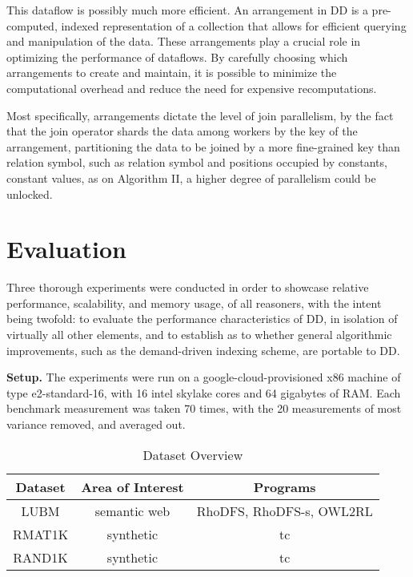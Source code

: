 \documentclass[sigconf,screen,review=false,natbib]{acmart}
\theoremstyle{definition}
\begin{document}
This dataflow is possibly much more efficient. An arrangement in DD is a pre-computed, indexed representation of a collection that allows
for efficient querying and manipulation of the data. These arrangements play a crucial role in optimizing the performance of dataflows. By carefully choosing
which arrangements to create and maintain, it is possible to minimize the computational overhead and reduce the need for expensive recomputations.

Most specifically, arrangements dictate the level of join parallelism, by the fact that the join operator shards the data among workers by the key of
the arrangement, partitioning the data to be joined by a more fine-grained key than relation symbol, such as relation symbol and positions occupied by constants,
constant values, as on Algorithm II, a higher degree of parallelism could be unlocked.
\section{Evaluation}
Three thorough experiments were conducted in order to showcase relative performance, scalability, and memory usage, of all reasoners, with the intent being twofold:
to evaluate the performance characteristics of DD, in isolation of virtually all other elements, and to establish as to whether general algorithmic
improvements, such as the demand-driven indexing scheme, are portable to DD.

\textbf{Setup.} The experiments were run on a google-cloud-provisioned x86 machine of type e2-standard-16, with 16 intel skylake cores and 64 gigabytes of RAM. Each
benchmark measurement was taken 70 times, with the 20 measurements of most variance removed, and averaged out.
\begin{table*}
	\caption{Dataset Overview}
	\begin{tabular}{|c|c|c|}
		\hline
		Dataset & Area of Interest & Programs                 \\
		\hline
		LUBM    & semantic web     & RhoDFS, RhoDFS-s, OWL2RL \\
		\hline
		RMAT1K  & synthetic        & tc                       \\
		\hline
		RAND1K  & synthetic        & tc                       \\
		\hline
	\end{tabular}
	\label{tab:datasets}
\end{table*}
\end{document}

